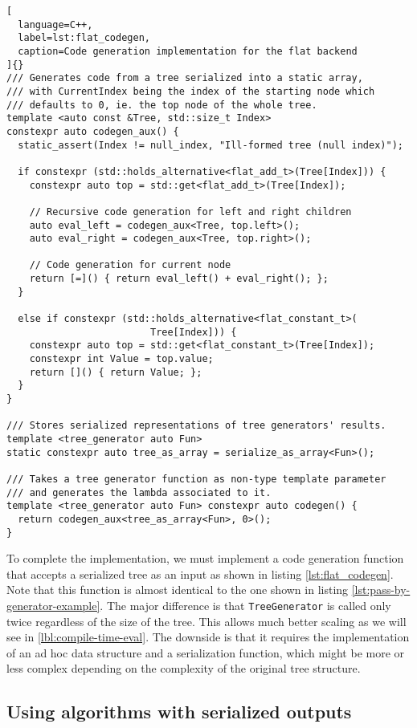 \documentclass[../main]{subfiles}
\begin{document}
\begin{lstlisting}[
  language=C++,
  label=lst:flat_codegen,
  caption=Code generation implementation for the flat backend
]{}
/// Generates code from a tree serialized into a static array,
/// with CurrentIndex being the index of the starting node which
/// defaults to 0, ie. the top node of the whole tree.
template <auto const &Tree, std::size_t Index>
constexpr auto codegen_aux() {
  static_assert(Index != null_index, "Ill-formed tree (null index)");

  if constexpr (std::holds_alternative<flat_add_t>(Tree[Index])) {
    constexpr auto top = std::get<flat_add_t>(Tree[Index]);

    // Recursive code generation for left and right children
    auto eval_left = codegen_aux<Tree, top.left>();
    auto eval_right = codegen_aux<Tree, top.right>();

    // Code generation for current node
    return [=]() { return eval_left() + eval_right(); };
  }

  else if constexpr (std::holds_alternative<flat_constant_t>(
                         Tree[Index])) {
    constexpr auto top = std::get<flat_constant_t>(Tree[Index]);
    constexpr int Value = top.value;
    return []() { return Value; };
  }
}

/// Stores serialized representations of tree generators' results.
template <tree_generator auto Fun>
static constexpr auto tree_as_array = serialize_as_array<Fun>();

/// Takes a tree generator function as non-type template parameter
/// and generates the lambda associated to it.
template <tree_generator auto Fun> constexpr auto codegen() {
  return codegen_aux<tree_as_array<Fun>, 0>();
}
\end{lstlisting}

To complete the implementation, we must implement a code generation function
that accepts a serialized tree as an input as shown in listing
\ref{lst:flat_codegen}. Note that this function is almost identical to
the one shown in listing \ref{lst:pass-by-generator-example}.
The major difference is that \lstinline{TreeGenerator} is called only
twice regardless of the size of the tree. This allows much better scaling
as we will see in \ref{lbl:compile-time-eval}.
The downside is that it requires the implementation of an ad hoc data
structure and a serialization function, which might be more or less complex
depending on the complexity of the original tree structure.

\subsection{
  Using algorithms with serialized outputs
}
\end{document}
